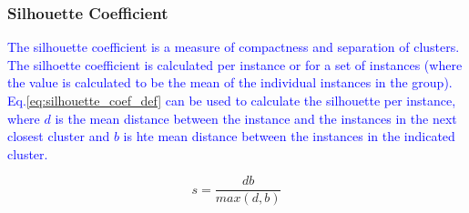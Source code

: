 \subsubsection{Silhouette Coefficient}

\textcolor{blue}{The {silhouette coefficient} is a measure of compactness and separation of clusters. The silhoette coefficient is calculated per instance or for a set of instances (where the value is calculated to be the mean of the individual instances in the group). Eq.\ref{eq:silhouette_coef_def} can be used to calculate the silhouette per instance, where $d$ is the mean distance between the instance and the instances in the next closest cluster and $b$ is hte mean distance between the instances in the indicated cluster.}

\begin{equation}
{s = \frac{db}{max(d,b)}}
\label{eq:silhouette_coef_def}
\end{equation}





